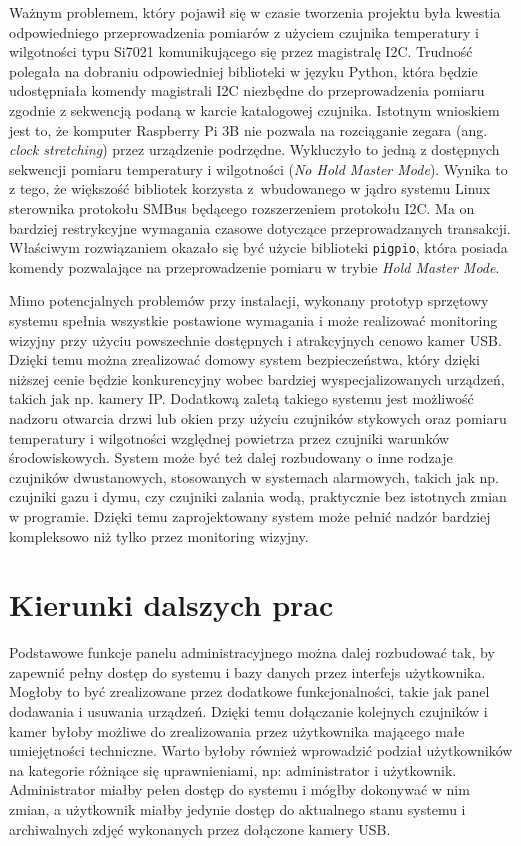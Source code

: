 \documentclass[a4paper,11pt,twoside]{article}
\begin{document}
Ważnym problemem, który pojawił się w czasie tworzenia projektu była kwestia odpowiedniego przeprowadzenia pomiarów z użyciem czujnika temperatury i wilgotności typu Si7021 komunikującego się przez magistralę I2C. Trudność polegała na dobraniu odpowiedniej biblioteki w języku Python, która będzie udostępniała komendy magistrali I2C niezbędne do przeprowadzenia pomiaru zgodnie z sekwencją podaną w karcie katalogowej czujnika. Istotnym wnioskiem jest to, że komputer Raspberry Pi 3B nie pozwala na rozciąganie zegara (ang. \textit{clock stretching}) przez urządzenie podrzędne. Wykluczyło to jedną z dostępnych sekwencji pomiaru temperatury i wilgotności (\textit{No Hold Master Mode}). Wynika to z tego, że większość bibliotek korzysta z~wbudowanego w jądro systemu Linux sterownika protokołu SMBus będącego rozszerzeniem protokołu I2C. Ma on bardziej restrykcyjne wymagania czasowe dotyczące przeprowadzanych transakcji. Właściwym rozwiązaniem okazało się być użycie biblioteki \texttt{pigpio}, która posiada komendy pozwalające na przeprowadzenie pomiaru w trybie \textit{Hold Master Mode}.

Mimo potencjalnych problemów przy instalacji, wykonany prototyp sprzętowy systemu spełnia wszystkie postawione wymagania i może realizować monitoring wizyjny przy użyciu powszechnie dostępnych i atrakcyjnych cenowo kamer USB. Dzięki temu można zrealizować domowy system bezpieczeństwa, który dzięki niższej cenie będzie konkurencyjny wobec bardziej wyspecjalizowanych urządzeń, takich jak np. kamery IP. Dodatkową zaletą takiego systemu jest możliwość nadzoru otwarcia drzwi lub okien przy użyciu czujników stykowych oraz pomiaru temperatury i wilgotności względnej powietrza przez czujniki warunków środowiskowych. System może być też dalej rozbudowany o inne rodzaje czujników dwustanowych, stosowanych w systemach alarmowych, takich jak np. czujniki gazu i dymu, czy czujniki zalania wodą, praktycznie bez istotnych zmian w programie. Dzięki temu zaprojektowany system może pełnić nadzór bardziej kompleksowo niż tylko przez monitoring wizyjny.

\section{Kierunki dalszych prac}

Podstawowe funkcje panelu administracyjnego można dalej rozbudować tak, by zapewnić pełny dostęp do systemu i bazy danych przez interfejs użytkownika. Mogłoby to być zrealizowane przez dodatkowe funkcjonalności, takie jak panel dodawania i usuwania urządzeń. Dzięki temu dołączanie kolejnych czujników i kamer byłoby możliwe do zrealizowania przez użytkownika mającego małe umiejętności techniczne. Warto byłoby również wprowadzić podział użytkowników na kategorie różniące się uprawnieniami, np: administrator i użytkownik. Administrator miałby pełen dostęp do systemu i mógłby dokonywać w nim zmian, a użytkownik miałby jedynie dostęp do aktualnego stanu systemu i archiwalnych zdjęć wykonanych przez dołączone kamery USB.
\end{document}
